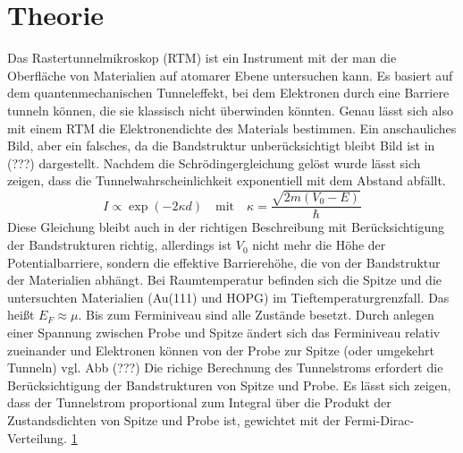 \documentclass{article}
\begin{document}
\section{Theorie}
Das Rastertunnelmikroskop (RTM) ist ein Instrument mit der man die Oberfläche von Materialien auf atomarer Ebene untersuchen kann. Es basiert auf dem quantenmechanischen Tunneleffekt, bei dem Elektronen durch eine Barriere tunneln können, die sie klassisch nicht überwinden könnten. Genau lässt sich also mit einem RTM die Elektronendichte des Materials bestimmen. 
Ein anschauliches Bild, aber ein falsches, da die Bandstruktur unberücksichtigt bleibt Bild ist in (???) dargestellt. 
Nachdem die Schrödingergleichung gelöst wurde lässt sich zeigen, dass die Tunnelwahrscheinlichkeit exponentiell mit dem Abstand abfällt. 
\[
I \propto \exp(-2\kappa d) \quad \text{mit} \quad \kappa = \frac{\sqrt{2m(V_0-E)}}{\hbar} 
\]
Diese Gleichung bleibt auch in der richtigen Beschreibung mit Berücksichtigung der Bandstrukturen richtig, allerdings ist $V_0$ nicht mehr die Höhe der Potentialbarriere, sondern die effektive Barrierehöhe, die von der Bandstruktur der Materialien abhängt.
Bei Raumtemperatur befinden sich die Spitze und die untersuchten Materialien (Au(111) und HOPG) im Tieftemperaturgrenzfall. Das heißt $E_F \approx \mu$. Bis zum Ferminiveau sind alle Zustände besetzt. Durch anlegen einer Spannung zwischen Probe und Spitze ändert sich das Ferminiveau relativ zueinander und Elektronen können von der Probe zur Spitze (oder umgekehrt Tunneln) vgl. Abb (???) 
Die richige Berechnung des Tunnelstroms erfordert die Berücksichtigung der Bandstrukturen von Spitze und Probe. Es lässt sich zeigen, dass der Tunnelstrom proportional zum Integral über die Produkt der Zustandsdichten von Spitze und Probe ist, gewichtet mit der Fermi-Dirac-Verteilung. \ref{} 
\end{document}
